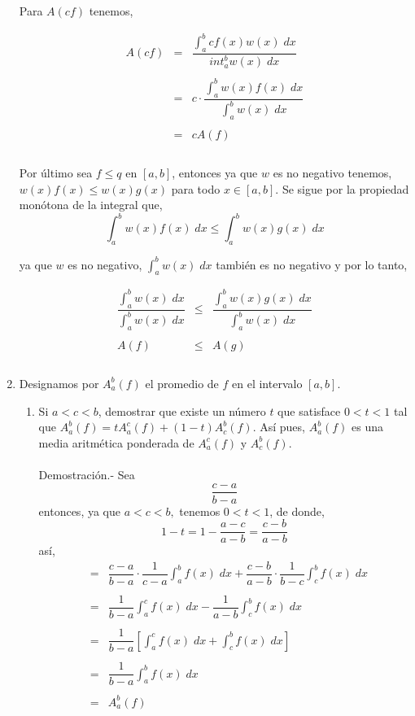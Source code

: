 \begin{enumerate}[\bfseries 1.]
    Para $A(cf)$ tenemos,

    $$\begin{array}{rcl}
	A(cf)&=&\dfrac{\int_a^b cf(x)w(x)\; dx}{int_a^b w(x)\; dx}\\\\
	     &=&c\cdot \dfrac{\int_a^b w(x)f(x)\; dx}{\int_a^b w(x)\; dx}\\\\
	     &=&cA(f)\\\\
    \end{array}$$

    Por último sea $f\leq q$ en $[a,b]$, entonces ya que $w$ es no negativo tenemos, $w(x)f(x)\leq w(x)g(x)$ para todo $x\in [a,b]$. Se sigue por la propiedad monótona de la integral que,
    $$\int_a^b w(x)f(x)\; dx\leq \int_a^b w(x)g(x)\; dx$$

    ya que $w$ es no negativo, $\int_a^b w(x)\; dx$ también es no negativo y por lo tanto,

    $$\begin{array}{rcl}
	\dfrac{\int_a^b w(x)\; dx}{\int_a^b w(x)\; dx}&\leq&\dfrac{\int_a^b w(x)g(x)\; dx}{\int_a^b w(x)\; dx}\\\\
	A(f)&\leq&A(g)\\\\
    \end{array}$$

\item Designamos por $A_a^b(f)$ el promedio de $f$ en el intervalo $[a,b]$.

    \begin{enumerate}[\bfseries (a)]

	\item Si $a<c<b$, demostrar que existe un número $t$ que satisface $0<t<1$ tal que $A_a^b(f)=tA_a^c(f)+(1-t)A_c^b (f)$. Así pues, $A_a^b(f)$ es una media aritmética ponderada de $A_a^c(f)$ y $A_c^b(f)$.\\\\
	    Demostración.-\; Sea $$\dfrac{c-a}{b-a}$$
	    entonces, ya que $a<c<b,$ tenemos $0<t<1$, de donde,
	    $$1-t=1-\dfrac{a-c}{a-b} = \dfrac{c-b}{a-b}$$
	    así,
	    $$\begin{array}{rcl}
		&=&\displaystyle \dfrac{c-a}{b-a}\cdot \dfrac{1}{c-a}\int_a^b f(x)\; dx + \dfrac{c-b}{a-b}\cdot \dfrac{1}{b-c}\int_c^b f(x)\; dx\\\\
		&=&\displaystyle\dfrac{1}{b-a}\int_a^c f(x)\; dx - \dfrac{1}{a-b} \int_c^b f(x)\; dx\\\\
		&=&\displaystyle\dfrac{1}{b-a}\left[\int_a^c f(x)\; dx + \int_c^b f(x)\; dx\right]\\\\
		&=&\displaystyle\dfrac{1}{b-a}\int_a^b f(x)\; dx\\\\
		&=&A_a^b(f)\\\\
	    \end{array}$$


\end{enumerate}
\end{enumerate}
